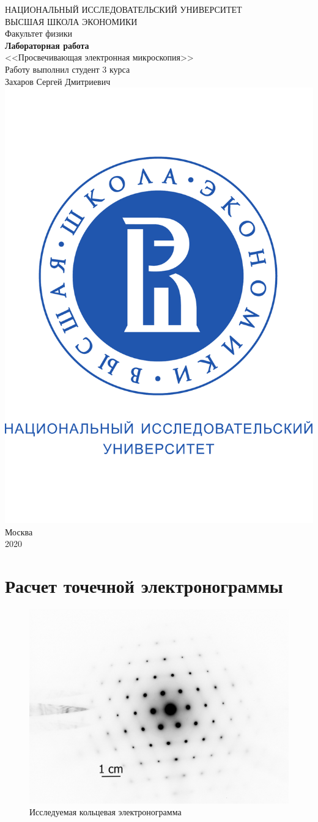 \documentclass[a4paper, 12pt]{article}
\begin{document}
	\begin{titlepage}
		\begin{center}
			$$$$
			$$$$
			$$$$
			$$$$
			{\Large{НАЦИОНАЛЬНЫЙ ИССЛЕДОВАТЕЛЬСКИЙ УНИВЕРСИТЕТ}}\\
			\vspace{0.1cm}
			{\Large{ВЫСШАЯ ШКОЛА ЭКОНОМИКИ}}\\
			\vspace{0.25cm}
			{\large{Факультет физики}}\\
			\vspace{4cm}
			{\Huge\textbf{{Лабораторная работа}}}\\%
			\vspace{1cm}
			{\LARGE{<<Просвечивающая электронная микроскопия>>}}\\%
			\vspace{2cm}
			{Работу выполнил студент 3 курса}\\
			{Захаров Сергей Дмитриевич}
			\vfill
			\includegraphics[width=0.2\linewidth]{HSElogo}
			\vfill
			Москва\\
			2020
		\end{center}
	\end{titlepage}

\tableofcontents

\newpage

\section{Расчет точечной электронограммы}

\begin{figure}[H]
	\centering
	\includegraphics[width=0.7\linewidth, angle=90]{т2}
	\caption{Исследуемая кольцевая электронограмма}
	\label{fig:dots}
\end{figure}
\end{document}
